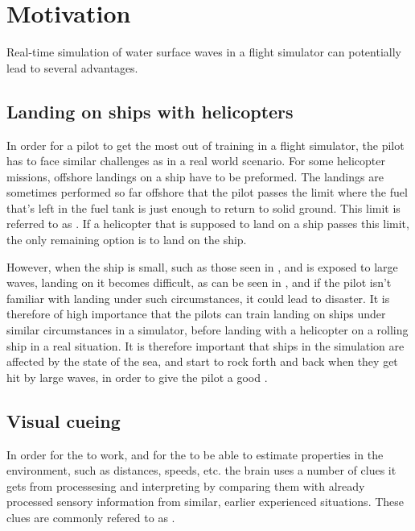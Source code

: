 \chapter{Motivation}

Real-time simulation of water surface waves in a flight simulator can potentially lead to several advantages.

\section{Landing on ships with helicopters}

In order for a pilot to get the most out of training in a flight simulator, the pilot has to face similar challenges as in a real world scenario. For some helicopter missions, offshore landings on a ship have to be preformed. The landings are sometimes performed so far offshore that the pilot passes the limit where the fuel that's left in the fuel tank is just enough to return to solid ground. This limit is referred to as . If a helicopter that is supposed to land on a ship passes this limit, the only remaining option is to land on the ship.

However, when the ship is small, such as those seen in \citep{MrOawal2009,PrismDefence2010,KopulaDK2010}, and is exposed to large waves, landing on it becomes difficult, as can be seen in \citep{PrismDefence2010}, and if the pilot isn't familiar with landing under such circumstances, it could lead to disaster. It is therefore of high importance that the pilots can train landing on ships under similar circumstances in a simulator, before landing with a helicopter on a rolling ship in a real situation. It is therefore important that ships in the simulation are affected by the state of the sea, and start to rock forth and back when they get hit by large waves, in order to give the pilot a good .

\section{Visual cueing}

In order for the  to work, and for the \brain to be able to estimate properties in the environment, such as distances, speeds, etc. the brain uses a number of clues it gets from processesing and interpreting  by comparing them with already processed sensory information from similar, earlier experienced situations. These clues are commonly refered to as .


